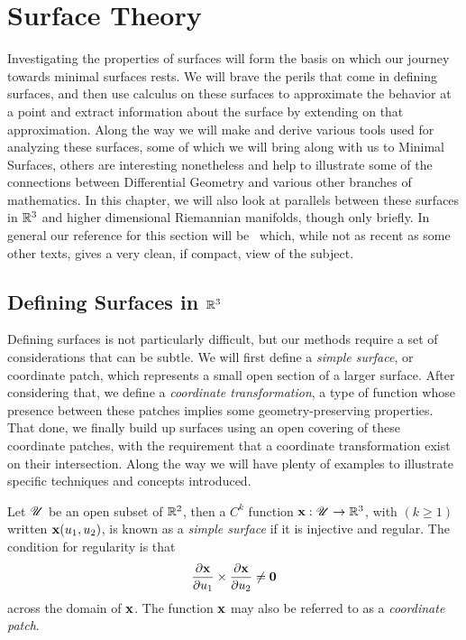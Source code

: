 \section{Surface Theory}

Investigating the properties of surfaces will form the basis on which our journey towards minimal surfaces rests. We will brave the perils that come in defining surfaces, and then use calculus on these surfaces to approximate the behavior at a point and extract information about the surface by extending on that approximation. Along the way we will make and derive various tools used for analyzing these surfaces, some of which we will bring along with us to Minimal Surfaces, others are interesting nonetheless and help to illustrate some of the connections between Differential Geometry and various other branches of mathematics. In this chapter, we will also look at parallels between these surfaces in $\mathbb{R}^3$ and higher dimensional Riemannian manifolds, though only briefly. In general our reference for this section will be~\cite{MP77} which, while not as recent as some other texts, gives a very clean, if compact, view of the subject.

\subsection{Defining Surfaces in $\mathbb{R}^3$}

Defining surfaces is not particularly difficult, but our methods require a set of considerations that can be subtle. We will first define a \emph{simple surface}, or coordinate patch, which represents a small open section of a larger surface. After considering that, we define a \emph{coordinate transformation}, a type of function whose presence between these patches implies some geometry-preserving properties. That done, we finally build up surfaces using an open covering of these coordinate patches, with the requirement that a coordinate transformation exist on their intersection. Along the way we will have plenty of examples to illustrate specific techniques and concepts introduced.

\begin{defn} %
  Let $\mathscr{U}$ be an open subset of $\mathbb{R}^2$, then a $C^k$ function $\mathbf{x}: \mathscr{U} \to \mathbb{R}^3$, with $(k \ge 1)$ written $\mathbf{x}(u_1, u_2)$, is known as a \emph{simple surface} if it is injective and regular. The condition for regularity is that
  \[
    \frac{\partial\mathbf{x}}{\partial u_1} \times \frac{\partial\mathbf{x}}{\partial u_2} \neq \mathbf{0}
  \]
  across the domain of $\mathbf{x}$. The function $\mathbf{x}$ may also be referred to as a \emph{coordinate patch}.
\end{defn}

